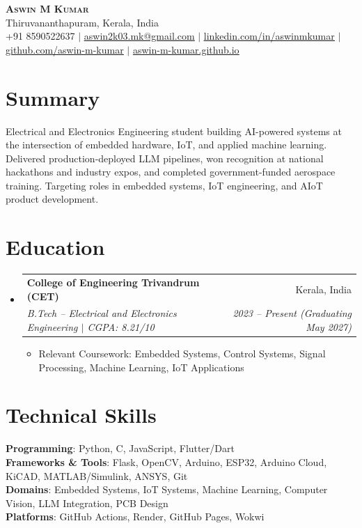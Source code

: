 \documentclass[letterpaper,10pt]{article}
\makeatletter
\newcommand{\resumeItem}[1]{
  \item\small{#1 \vspace{-2pt}}
}
\newcommand{\resumeSubheading}[4]{
  \vspace{-2pt}\item
    \begin{tabular*}{0.97\textwidth}[t]{l@{\extracolsep{\fill}}r}
      \textbf{#1} & #2 \\
      \textit{\small#3} & \textit{\small #4} \\
    \end{tabular*}\vspace{-7pt}
}
\newcommand{\resumeSubHeadingListStart}{\begin{itemize}[leftmargin=0.15in, label={}]}
\newcommand{\resumeSubHeadingListEnd}{\end{itemize}}
\newcommand{\resumeItemListStart}{\begin{itemize}}
\newcommand{\resumeItemListEnd}{\end{itemize}\vspace{-5pt}}
\makeatother
\begin{document}
\begin{center}
    \textbf{\Huge \scshape Aswin M Kumar} \\ \vspace{1pt}
    \small Thiruvananthapuram, Kerala, India \\
    \small +91 8590522637 $|$
    \href{mailto:aswin2k03.mk@gmail.com}{\underline{aswin2k03.mk@gmail.com}} $|$
    \href{https://linkedin.com/in/aswinmkumar}{\underline{linkedin.com/in/aswinmkumar}} $|$
    \href{https://github.com/aswin-m-kumar}{\underline{github.com/aswin-m-kumar}} $|$
    \href{https://aswin-m-kumar.github.io}{\underline{aswin-m-kumar.github.io}}
\end{center}

\section{Summary}
\small{
Electrical and Electronics Engineering student building AI-powered systems at the intersection of embedded hardware, IoT, and applied machine learning. Delivered production-deployed LLM pipelines, won recognition at national hackathons and industry expos, and completed government-funded aerospace training. Targeting roles in embedded systems, IoT engineering, and AIoT product development.
}

\section{Education}
  \resumeSubHeadingListStart
    \resumeSubheading
      {College of Engineering Trivandrum (CET)}{Kerala, India}
      {B.Tech -- Electrical and Electronics Engineering $|$ CGPA: 8.21/10}{2023 -- Present (Graduating May 2027)}
    \resumeItemListStart
      \resumeItem{Relevant Coursework: Embedded Systems, Control Systems, Signal Processing, Machine Learning, IoT Applications}
    \resumeItemListEnd
  \resumeSubHeadingListEnd

\section{Technical Skills}
 \begin{itemize}[leftmargin=0.15in, label={}]
    \small{\item{
     \textbf{Programming}{: Python, C, JavaScript, Flutter/Dart} \\
     \textbf{Frameworks \& Tools}{: Flask, OpenCV, Arduino, ESP32, Arduino Cloud, KiCAD, MATLAB/Simulink, ANSYS, Git} \\
     \textbf{Domains}{: Embedded Systems, IoT Systems, Machine Learning, Computer Vision, LLM Integration, PCB Design} \\
     \textbf{Platforms}{: GitHub Actions, Render, GitHub Pages, Wokwi}
    }}
 \end{itemize}
\end{document}
